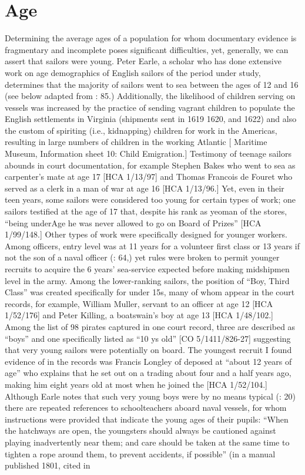 \section{{Age}}\label{sec:3.4}

  Determining the average ages of a population for whom documentary evidence is fragmentary and incomplete poses significant difficulties, yet, generally, we can assert that sailors were young. Peter Earle, a scholar who has done extensive work on age demographics of English sailors of the period under study, determines that the majority of sailors went to sea between the ages of 12 and 16 (see  below adapted from \citealt{Earle1993}: 85.) Additionally, the likelihood of children serving on vessels was increased by the practice of sending vagrant children to populate the English settlements in Virginia (shipments sent in 1619 1620, and 1622) and also the custom of spiriting (i.e., kidnapping) children for work in the Americas, resulting in large numbers of children in the working Atlantic [ Maritime Museum, Information sheet 10: Child Emigration.] Testimony of teenage sailors abounds in court documentation, for example Stephen Bakes who went to sea as carpenter’s mate at age 17 [HCA 1/13/97] and Thomas Francois de Fouret who served as a clerk in a man of war at age 16 [HCA 1/13/96.] Yet, even in their teen years, some sailors were considered too young for certain types of work; one sailors testified at the age of 17 that, despite his rank as yeoman of the stores, “being underAge he was never allowed to go on Board of Prizes” [HCA 1/99/148.] Other types of work were specifically designed for younger workers. Among officers, entry level was at 11 years for a volunteer first class or 13 years if not the son of a naval officer (\citealt{AdkinsAdkins2008}: 64,) yet rules were broken to permit younger recruits to acquire the 6 years’ sea-service expected before making midshipmen level in the army. Among the lower-ranking sailors, the position of “Boy, Third Class” was created specifically for under 15s, many of whom appear in the court records, for example, William Muller, servant to an officer at age 12 [HCA 1/52/176] and Peter Killing, a boatswain's boy at age 13 [HCA 1/48/102.] Among the list of 98 pirates captured in one court record, three are described as “boys” and one specifically listed as “10 ys old” [CO 5/1411/826-27] suggesting that very young sailors were potentially on board. The youngest recruit I found evidence of in the records was Francis Longley of  deposed at “about 12 years of age” who explains that he set out on a trading  about four and a half years ago, making him eight years old at most when he joined the  [HCA 1/52/104.] Although Earle notes that such very young boys were by no means typical (\citeyear*{Earle1998}: 20) there are repeated references to schoolteachers aboard naval vessels, for whom instructions were provided that indicate the young ages of their pupils: “When the hatchways are open, the youngsters should always be cautioned against playing inadvertently near them; and care should be taken at the same time to tighten a rope around them, to prevent accidents, if possible” (in a manual published 1801, cited in 